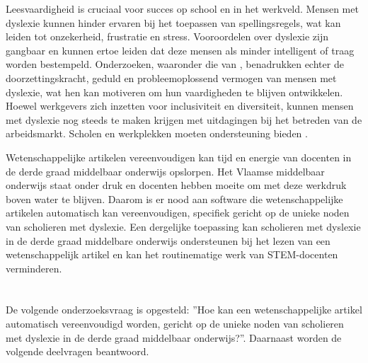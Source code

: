 Leesvaardigheid is cruciaal voor succes op school en in het werkveld. Mensen met dyslexie kunnen hinder ervaren bij het toepassen van spellingsregels, wat kan leiden tot onzekerheid, frustratie en stress. Vooroordelen over dyslexie zijn gangbaar en kunnen ertoe leiden dat deze mensen als minder intelligent of traag worden bestempeld. Onderzoeken, waaronder die van \textcite{Ghesquiere2018, Lissens2020, Bonte2020}, benadrukken echter de doorzettingskracht, geduld en probleemoplossend vermogen van mensen met dyslexie, wat hen kan motiveren om hun vaardigheden te blijven ontwikkelen. Hoewel werkgevers zich inzetten voor inclusiviteit en diversiteit, kunnen mensen met dyslexie nog steeds te maken krijgen met uitdagingen bij het betreden van de arbeidsmarkt. Scholen en werkplekken moeten ondersteuning bieden \autocite{Lissens2020}.

Wetenschappelijke artikelen vereenvoudigen kan tijd en energie van docenten in de derde graad middelbaar onderwijs opslorpen. Het Vlaamse middelbaar onderwijs staat onder druk en docenten hebben moeite om met deze werkdruk boven water te blijven. Daarom is er nood aan software die wetenschappelijke artikelen automatisch kan vereenvoudigen, specifiek gericht op de unieke noden van scholieren met dyslexie. Een dergelijke toepassing kan scholieren met dyslexie in de derde graad middelbare onderwijs ondersteunen bij het lezen van een wetenschappelijk artikel en kan het routinematige werk van STEM-docenten verminderen.

\section{}%
\label{sec:onderzoeksvraag}

De volgende onderzoeksvraag is opgesteld: ”Hoe kan een wetenschappelijke artikel automatisch vereenvoudigd worden, gericht op de unieke noden van scholieren met dyslexie in de derde graad middelbaar onderwijs?”. Daarnaast worden de volgende deelvragen beantwoord.

